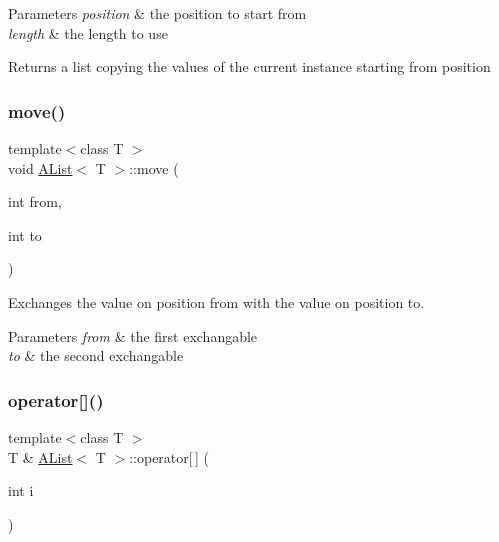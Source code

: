 \begin{DoxyParams}{Parameters}
{\em position} & the position to start from \\
\hline
{\em length} & the length to use \\
\hline
\end{DoxyParams}
\begin{DoxyReturn}{Returns}
a list copying the values of the current instance starting from position 
\end{DoxyReturn}
\mbox{\label{class_a_list_ac9979a4b71ae418f1ba7a36b2d9c1a77}} 
\subsubsection{\texorpdfstring{move()}{move()}}
{\footnotesize\ttfamily template$<$class T $>$ \\
void \mbox{\hyperlink{class_a_list}{A\+List}}$<$ T $>$\+::move (\begin{DoxyParamCaption}\item[{int}]{from,  }\item[{int}]{to }\end{DoxyParamCaption})}



Exchanges the value on position from with the value on position to. 


\begin{DoxyParams}{Parameters}
{\em from} & the first exchangable \\
\hline
{\em to} & the second exchangable \\
\hline
\end{DoxyParams}
\mbox{\label{class_a_list_ae14e6bff6596b91b77a40b0d03777e66}} 
\subsubsection{\texorpdfstring{operator[]()}{operator[]()}\hspace{0.1cm}{\footnotesize\ttfamily [1/2]}}
{\footnotesize\ttfamily template$<$class T $>$ \\
T \& \mbox{\hyperlink{class_a_list}{A\+List}}$<$ T $>$\+::operator\mbox{[}$\,$\mbox{]} (\begin{DoxyParamCaption}\item[{int}]{i }\end{DoxyParamCaption})\hspace{0.3cm}{\ttfamily [inline]}}



